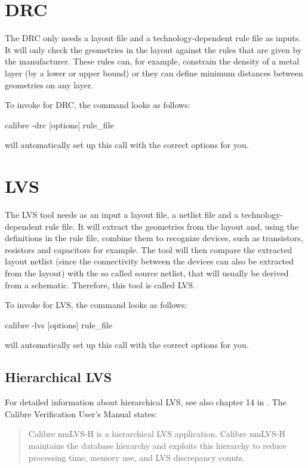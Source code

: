 \section{DRC}
The \gls{DRC} only needs a layout file and a technology-dependent rule file as
inputs. It will only check the geometries in the layout against the rules that
are given by the manufacturer. These rules can, for example, constrain the
density of a metal layer (by a lower or upper bound) or they can define minimum
distances between geometries on any layer.

To invoke  for DRC, the command looks as follows:

\begin{lstbashplain}
 calibre -drc [options] rule_file
\end{lstbashplain}

 will automatically set up this call with the correct options for
you.

\section{LVS}
The \gls{LVS} tool needs as an input a layout file, a netlist file and a
technology-dependent rule file. It will extract the geometries from the layout
and, using the definitions in the rule file, combine them to recognize devices,
such as transistors, resistors and capacitors for example.
The tool will then compare the extracted layout netlist (since the connectivity
between the devices can also be extracted from the layout) with the so called
source netlist, that will usually be derived from a schematic. Therefore, this
tool is called \acrlong{LVS}.

To invoke  for \gls{LVS}, the command looks as follows:
\begin{lstbashplain}
calibre -lvs [options] rule_file
\end{lstbashplain}

 will automatically set up this call with the correct options for
you.

\subsection{Hierarchical LVS}
For detailed information about hierarchical \gls{LVS}, see also chapter 14 in
\citep{calibre2014ver}.
The Calibre Verification User's Manual \citep{calibre2014ver} states:
\begin{quote}
Calibre nmLVS-H is a hierarchical LVS application. Calibre nmLVS-H maintains
the database hierarchy and exploits this hierarchy to reduce processing time,
memory use, and LVS discrepancy counts.
\end{quote}

